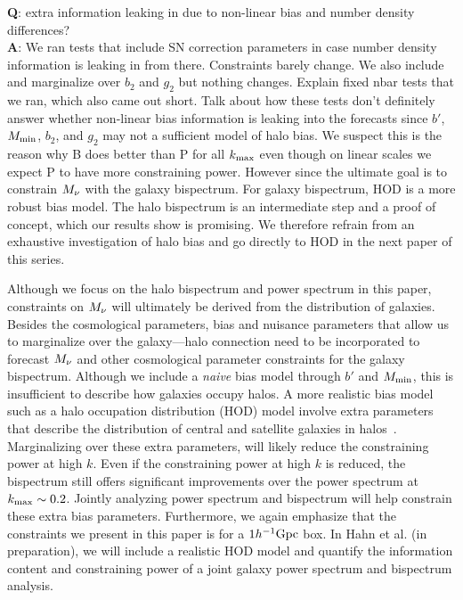 {\bf Q}: extra information leaking in due to non-linear bias and number density differences? \\
{\bf A}: We ran tests that include SN correction parameters in case number density 
information is leaking in from there. Constraints barely change. We also include and marginalize 
over $b_2$ and $g_2$ but nothing changes. Explain fixed nbar tests that we ran, which also came 
out short. Talk about how these tests don't definitely answer whether non-linear bias information
is leaking into the forecasts since $b'$, $M_{\rm min}$, $b_2$, and $g_2$ may not a sufficient
model of halo bias. We suspect this is the reason why B does better than P for all $k_{\rm max}$ 
even though on linear scales we expect P to have more constraining power. 
However since the ultimate goal is to constrain $M_\nu$ with the galaxy 
bispectrum.  For galaxy bispectrum, HOD is a more robust bias model. The halo bispectrum is an
intermediate step and a proof of concept, which our results show is promising. We therefore 
refrain from an exhaustive investigation of halo bias and go directly to HOD in the next paper 
of this series.

Although we focus on the halo bispectrum and power spectrum in this paper, 
constraints on $M_\nu$ will ultimately be derived from the distribution of 
galaxies. Besides the cosmological parameters, bias and nuisance parameters 
that allow us to marginalize over the galaxy---halo connection need to be
incorporated to forecast $M_\nu$ and other cosmological parameter constraints 
for the galaxy bispectrum. Although we include a \emph{naive} bias model 
through $b'$ and $M_{\rm min}$, this is insufficient to describe how galaxies
occupy halos. A more realistic bias model such as a halo occupation distribution 
(HOD) model involve extra parameters that describe the distribution of central 
and satellite galaxies in halos~\citep[\emph{e.g.}][]{zheng2005,leauthaud2012a,tinker2013,zentner2016,vakili2019}. 
Marginalizing over these extra parameters, will likely reduce the constraining 
power at high $k$. Even if the constraining power at high $k$ is reduced, the
bispectrum still offers significant improvements over the power spectrum at 
$k_{\rm max} \sim 0.2$. Jointly analyzing power spectrum and bispectrum will 
help constrain these extra bias parameters. 
 Furthermore, we again emphasize that
the constraints we present in this paper is for a $1h^{-1}{\rm Gpc}$ box. In 
Hahn et al. (in preparation), we will include a realistic HOD model and quantify 
the information content and constraining power of a joint galaxy power spectrum 
and bispectrum analysis. 
